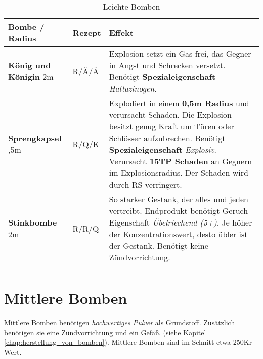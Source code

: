 \begin{longtable}{|p{4cm}|p{}|p{9cm}|}
\hline
\textbf{Bombe} / Radius & \textbf{Rezept} & \textbf{Effekt} \\ \hline

\textbf{König und Königin} \newline 2m & R/Ä/Ä & Explosion setzt ein Gas frei, das Gegner in Angst und Schrecken versetzt. Benötigt \textbf{Spezialeigenschaft} \textit{Halluzinogen}. \\ \hline

\textbf{Sprengkapsel} \newline 0,5m & R/Q/K & Explodiert in einem \textbf{0,5m Radius} und verursacht Schaden. Die Explosion besitzt genug Kraft um Türen oder Schlösser aufzubrechen. Benötigt \textbf{Spezialeigenschaft} \textit{Explosiv}. Verursacht \textbf{15TP Schaden} an Gegnern im Explosionsradius. Der Schaden wird durch RS verringert. \\ \hline

\textbf{Stinkbombe} \newline 2m & R/R/Q & So starker Gestank, der alles und jeden vertreibt. Endprodukt benötigt Geruch-Eigenschaft \textit{Übelriechend (5+)}. Je höher der Konzentrationswert, desto übler ist der Gestank. Benötigt keine Zündvorrichtung. \\ \hline

\caption{Leichte Bomben}
\label{tab:leichte_bomben}
\end{longtable}


\section{Mittlere Bomben}
Mittlere Bomben benötigen \textit{hochwertiges Pulver} als Grundstoff. Zusätzlich benötigen sie eine Zündvorrichtung und ein Gefäß. (siehe Kapitel \ref{chap:herstellung_von_bomben}). Mittlere Bomben sind im Schnitt etwa 250Kr Wert.

